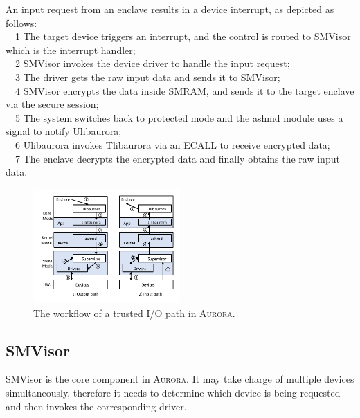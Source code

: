 \par
An input request from an enclave results in a device interrupt, as depicted as follows:\\
~~\textcircled{\footnotesize{1}} The target device triggers an interrupt, and the control is routed to SMVisor which is the interrupt handler;\\
~~\textcircled{\footnotesize{2}} SMVisor invokes the device driver to handle the input request;\\
~~\textcircled{\footnotesize{3}} The driver gets the raw input data and sends it to SMVisor;\\
~~\textcircled{\footnotesize{4}} SMVisor encrypts the data inside SMRAM, and sends it to the target enclave via the secure session;\\
~~\textcircled{\footnotesize{5}} The system switches back to protected mode and the ashmd module uses a signal to notify Ulibaurora;\\
~~\textcircled{\footnotesize{6}} Ulibaurora invokes Tlibaurora via an ECALL to receive encrypted data;\\
~~\textcircled{\footnotesize{7}} The enclave decrypts the encrypted data and finally obtains the raw input data. %

\begin{figure}
	\centering
	\includegraphics[width=0.5\textwidth]{figures/workflow.pdf} %
	\caption{The workflow of a trusted I/O path in \textsc{Aurora}. }%
	\label{fig:workflow}
\end{figure}

\subsection{SMVisor}\label{ssv}

SMVisor is the core component in \textsc{Aurora}.  It may take charge of multiple devices simultaneously, therefore it needs to determine which device is being requested and then invokes the corresponding driver. 

